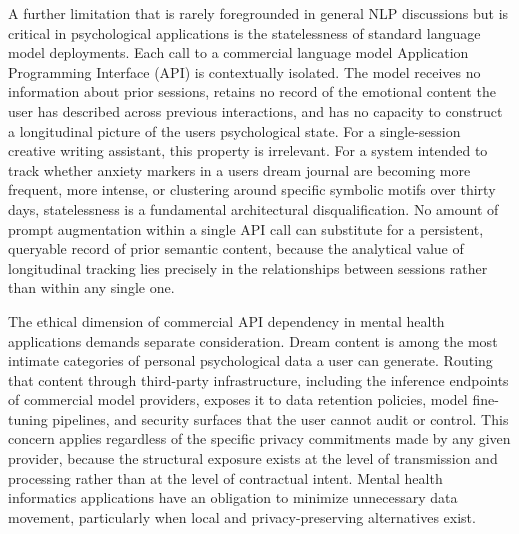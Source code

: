 \documentclass[12pt,a4paper]{report}
\begin{document}
A further limitation that is rarely foregrounded in general NLP discussions but is critical in psychological applications is the statelessness of standard language model deployments. Each call to a commercial language model Application Programming Interface (API) is contextually isolated. The model receives no information about prior sessions, retains no record of the emotional content the user has described across previous interactions, and has no capacity to construct a longitudinal picture of the user\textquotesingle{}s psychological state. For a single-session creative writing assistant, this property is irrelevant. For a system intended to track whether anxiety markers in a user\textquotesingle{}s dream journal are becoming more frequent, more intense, or clustering around specific symbolic motifs over thirty days, statelessness is a fundamental architectural disqualification. No amount of prompt augmentation within a single API call can substitute for a persistent, queryable record of prior semantic content, because the analytical value of longitudinal tracking lies precisely in the relationships between sessions rather than within any single one.

The ethical dimension of commercial API dependency in mental health applications demands separate consideration. Dream content is among the most intimate categories of personal psychological data a user can generate. Routing that content through third-party infrastructure, including the inference endpoints of commercial model providers, exposes it to data retention policies, model fine-tuning pipelines, and security surfaces that the user cannot audit or control. This concern applies regardless of the specific privacy commitments made by any given provider, because the structural exposure exists at the level of transmission and processing rather than at the level of contractual intent. Mental health informatics applications have an obligation to minimize unnecessary data movement, particularly when local and privacy-preserving alternatives exist.
\end{document}
